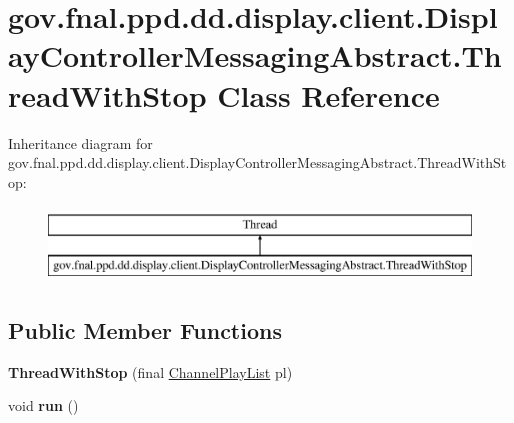\hypertarget{classgov_1_1fnal_1_1ppd_1_1dd_1_1display_1_1client_1_1DisplayControllerMessagingAbstract_1_1ThreadWithStop}{\section{gov.\-fnal.\-ppd.\-dd.\-display.\-client.\-Display\-Controller\-Messaging\-Abstract.\-Thread\-With\-Stop Class Reference}
\label{classgov_1_1fnal_1_1ppd_1_1dd_1_1display_1_1client_1_1DisplayControllerMessagingAbstract_1_1ThreadWithStop}
}
Inheritance diagram for gov.\-fnal.\-ppd.\-dd.\-display.\-client.\-Display\-Controller\-Messaging\-Abstract.\-Thread\-With\-Stop\-:\begin{figure}[H]
\begin{center}
\leavevmode
\includegraphics[height=2.000000cm]{classgov_1_1fnal_1_1ppd_1_1dd_1_1display_1_1client_1_1DisplayControllerMessagingAbstract_1_1ThreadWithStop}
\end{center}
\end{figure}
\subsection*{Public Member Functions}
\begin{DoxyCompactItemize}
\item 
\hypertarget{classgov_1_1fnal_1_1ppd_1_1dd_1_1display_1_1client_1_1DisplayControllerMessagingAbstract_1_1ThreadWithStop_aebe2e9dec1d69ac75d74ebcc867ed921}{{\bfseries Thread\-With\-Stop} (final \hyperlink{classgov_1_1fnal_1_1ppd_1_1dd_1_1channel_1_1ChannelPlayList}{Channel\-Play\-List} pl)}\label{classgov_1_1fnal_1_1ppd_1_1dd_1_1display_1_1client_1_1DisplayControllerMessagingAbstract_1_1ThreadWithStop_aebe2e9dec1d69ac75d74ebcc867ed921}

\item 
\hypertarget{classgov_1_1fnal_1_1ppd_1_1dd_1_1display_1_1client_1_1DisplayControllerMessagingAbstract_1_1ThreadWithStop_a3a8072938a59f88b0b1a62775ef1809b}{void {\bfseries run} ()}\label{classgov_1_1fnal_1_1ppd_1_1dd_1_1display_1_1client_1_1DisplayControllerMessagingAbstract_1_1ThreadWithStop_a3a8072938a59f88b0b1a62775ef1809b}

\end{DoxyCompactItemize}
